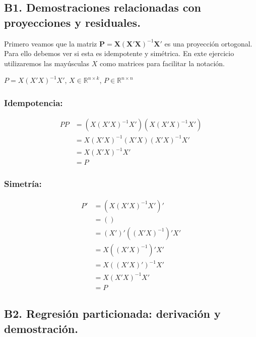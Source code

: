 \documentclass[12pt, letter]{article}
\begin{document}
\subsection{B1. Demostraciones relacionadas con proyecciones y residuales.}

Primero veamos que la matriz $\textbf{P} = \textbf{X}(\textbf{X}'\textbf{X})^{-1}\textbf{X}'$ es una proyección ortogonal. Para ello debemos ver si esta es idempotente y simétrica. En exte ejercicio utilizaremos las mayúsculas $X$ como matrices para facilitar la notación. 



\( P = X (X'X)^{-1} X' \), \quad \( X \in \mathbb{R}^{n \times k} \), \quad \( P \in \mathbb{R}^{n \times n} \)

\subsubsection*{Idempotencia:}
\begin{align*}
P P &= \left( X (X'X)^{-1} X' \right) \left( X (X'X)^{-1} X' \right) \\
    &= X (X'X)^{-1} (X'X) (X'X)^{-1} X' \\
    &= X (X'X)^{-1} X' \\
    &= P
\end{align*}

\subsubsection*{Simetría:}
\begin{align*}
P' &= \left( X (X'X)^{-1} X' \right)' \\
   &= \left(  \right) \\
   &= \left( X' \right)' \left( (X'X)^{-1} \right)' X' \\
   &= X \left( (X'X)^{-1} \right)' X' \\
   &= X \left( (X'X)' \right)^{-1} X' \\
   &= X \left( X'X \right)^{-1} X' \\
   &= P
\end{align*}


\subsection{B2. Regresión particionada: derivación y demostración.}
\end{document}
